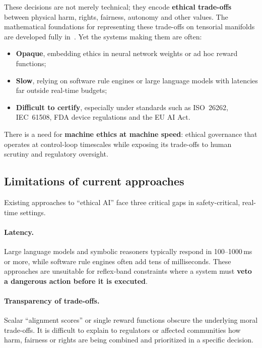 \documentclass[11pt]{article}
\begin{document}
These decisions are not merely technical; they encode \textbf{ethical trade-offs} between physical harm, rights, fairness, autonomy and other values. The mathematical foundations for representing these trade-offs on tensorial manifolds are developed fully in~\cite{bond2026ge}. Yet the systems making them are often:

\begin{itemize}
  \item \textbf{Opaque}, embedding ethics in neural network weights or ad hoc reward functions;
  \item \textbf{Slow}, relying on software rule engines or large language models with latencies far outside real-time budgets;
  \item \textbf{Difficult to certify}, especially under standards such as ISO~26262, IEC~61508, FDA device regulations and the EU AI Act.
\end{itemize}

There is a need for \textbf{machine ethics at machine speed}: ethical governance that operates at control-loop timescales while exposing its trade-offs to human scrutiny and regulatory oversight.

\subsection{Limitations of current approaches}

Existing approaches to ``ethical AI'' face three critical gaps in safety-critical, real-time settings.

\paragraph{Latency.}
Large language models and symbolic reasoners typically respond in 100--1000\,ms or more, while software rule engines often add tens of milliseconds. These approaches are unsuitable for reflex-band constraints where a system must \textbf{veto a dangerous action before it is executed}.

\paragraph{Transparency of trade-offs.}
Scalar ``alignment scores'' or single reward functions obscure the underlying moral trade-offs. It is difficult to explain to regulators or affected communities how harm, fairness or rights are being combined and prioritized in a specific decision.
\end{document}
